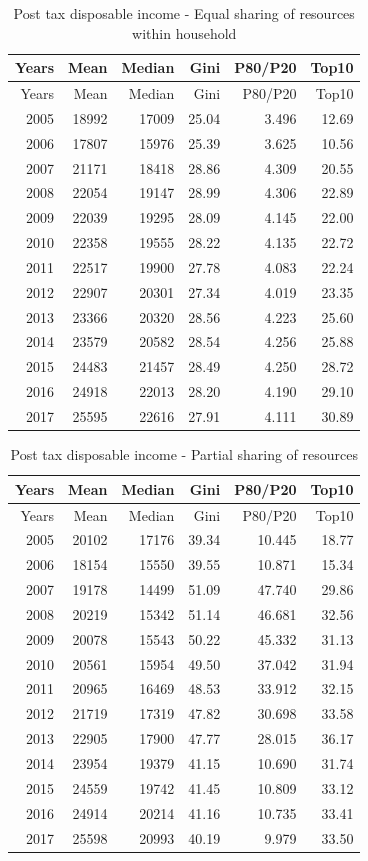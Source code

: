 \documentclass[12pt,]{article}
\begin{document}
\begin{longtable}[]{@{}rrrrrr@{}}
\caption{Post tax disposable income - Equal sharing of resources within
household}\tabularnewline
\toprule
Years & Mean & Median & Gini & P80/P20 & Top10\tabularnewline
\midrule
\endfirsthead
\toprule
Years & Mean & Median & Gini & P80/P20 & Top10\tabularnewline
\midrule
\endhead
2005 & 18992 & 17009 & 25.04 & 3.496 & 12.69\tabularnewline
2006 & 17807 & 15976 & 25.39 & 3.625 & 10.56\tabularnewline
2007 & 21171 & 18418 & 28.86 & 4.309 & 20.55\tabularnewline
2008 & 22054 & 19147 & 28.99 & 4.306 & 22.89\tabularnewline
2009 & 22039 & 19295 & 28.09 & 4.145 & 22.00\tabularnewline
2010 & 22358 & 19555 & 28.22 & 4.135 & 22.72\tabularnewline
2011 & 22517 & 19900 & 27.78 & 4.083 & 22.24\tabularnewline
2012 & 22907 & 20301 & 27.34 & 4.019 & 23.35\tabularnewline
2013 & 23366 & 20320 & 28.56 & 4.223 & 25.60\tabularnewline
2014 & 23579 & 20582 & 28.54 & 4.256 & 25.88\tabularnewline
2015 & 24483 & 21457 & 28.49 & 4.250 & 28.72\tabularnewline
2016 & 24918 & 22013 & 28.20 & 4.190 & 29.10\tabularnewline
2017 & 25595 & 22616 & 27.91 & 4.111 & 30.89\tabularnewline
\bottomrule
\end{longtable}

\begin{longtable}[]{@{}rrrrrr@{}}
\caption{Post tax disposable income - Partial sharing of
resources}\tabularnewline
\toprule
Years & Mean & Median & Gini & P80/P20 & Top10\tabularnewline
\midrule
\endfirsthead
\toprule
Years & Mean & Median & Gini & P80/P20 & Top10\tabularnewline
\midrule
\endhead
2005 & 20102 & 17176 & 39.34 & 10.445 & 18.77\tabularnewline
2006 & 18154 & 15550 & 39.55 & 10.871 & 15.34\tabularnewline
2007 & 19178 & 14499 & 51.09 & 47.740 & 29.86\tabularnewline
2008 & 20219 & 15342 & 51.14 & 46.681 & 32.56\tabularnewline
2009 & 20078 & 15543 & 50.22 & 45.332 & 31.13\tabularnewline
2010 & 20561 & 15954 & 49.50 & 37.042 & 31.94\tabularnewline
2011 & 20965 & 16469 & 48.53 & 33.912 & 32.15\tabularnewline
2012 & 21719 & 17319 & 47.82 & 30.698 & 33.58\tabularnewline
2013 & 22905 & 17900 & 47.77 & 28.015 & 36.17\tabularnewline
2014 & 23954 & 19379 & 41.15 & 10.690 & 31.74\tabularnewline
2015 & 24559 & 19742 & 41.45 & 10.809 & 33.12\tabularnewline
2016 & 24914 & 20214 & 41.16 & 10.735 & 33.41\tabularnewline
2017 & 25598 & 20993 & 40.19 & 9.979 & 33.50\tabularnewline
\bottomrule
\end{longtable}
\end{document}
